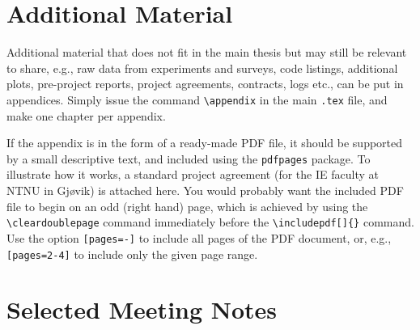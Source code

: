 \chapter{Additional Material}
\label{app:additional}

Additional material that does not fit in the main thesis but may still be relevant to share, e.g., raw data from experiments and surveys, code listings, additional plots, pre-project reports, project agreements, contracts, logs etc., can be put in appendices. Simply issue the command \texttt{\textbackslash appendix} in the main \texttt{.tex} file, and make one chapter per appendix.

If the appendix is in the form of a ready-made PDF file, it should be supported by a small descriptive text, and included using the \texttt{pdfpages} package. To illustrate how it works, a standard project agreement (for the IE faculty at NTNU in Gjøvik) is attached here. You would probably want the included PDF file to begin on an odd (right hand) page, which is achieved by using the \texttt{\textbackslash cleardoublepage} command immediately before the \texttt{\textbackslash includepdf[]\{\}} command. Use the option \texttt{[pages=-]} to include all pages of the PDF document, or, e.g., \texttt{[pages=2-4]} to include only the given page range.

\cleardoublepage















\chapter{Selected Meeting Notes}
\label{app:meeting-notes}



